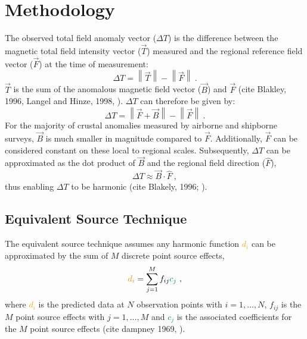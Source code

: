 \section{Methodology}
The observed total field anomaly vector ($\Delta T$) is the difference between the magnetic total field intensity vector ($\vec{T}$) measured and the regional reference field vector ($\vec{F}$) at the time of measurement:
\begin{equation}
    \Delta T = \left\lVert \vec{T} \right\rVert - \left\lVert \vec{F} \right\rVert
    \ .
\end{equation}
$\vec{T}$ is the sum of the anomalous magnetic field vector ($\vec{B}$) and $\vec{F}$ (cite Blakley, 1996, Langel and Hinze, 1998, \citep{OliveiraJr2015}). $\Delta T$ can therefore be given by:
\begin{equation}
    \Delta T = \left\lVert \vec{F} + \vec{B} \right\rVert - \left\lVert \vec{F} \right\rVert
    \ .
\end{equation}
For the majority of crustal anomalies measured by airborne and shipborne surveys, $\vec{B}$ is much smaller in magnitude compared to $\vec{F}$. Additionally, $\vec{F}$ can be considered constant on these local to regional scales. Subsequently, $\Delta T$ can be approximated as the dot product of $\vec{B}$ and the regional field direction ($\hat{F}$),
\begin{equation}
\label{'eq:tfa dot product'}
    \Delta T\approx  \vec{B} \cdot \hat{F}
    \ ,
\end{equation}
thus enabling $\Delta T$ to be harmonic (cite Blakely, 1996; \citep{OliveiraJr2015}).

\subsection{Equivalent Source Technique}
The equivalent source technique assumes any harmonic function \textcolor{orange}{$d_i$} can be approximated by the sum of $M$ discrete point source effects,
\begin{equation}
\label{'eq:eqs technique'}
\textcolor{orange}{d_i} = \sum_{j=1}^{M}  f_{ij} \textcolor{teal}{c_j}
\ ,
\end{equation}
where \textcolor{orange}{$d_i$} is the predicted data at $N$ observation points with $i = 1, ... , N$, $f_{ij}$ is the $M$ point source effects with $j = 1, ..., M$ and \textcolor{teal}{$c_j$} is the associated coefficients for the $M$ point source effects (cite dampney 1969, \cite{Cordell1992}).

